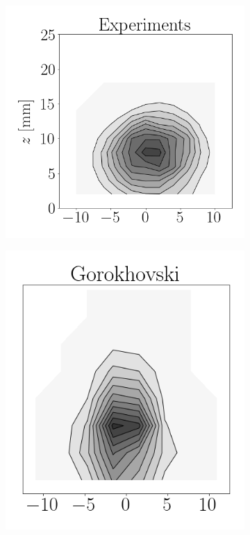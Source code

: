 \begin{figure}[t!]
\flushleft
\begin{subfigure}[b]{0.2\textwidth}
	\flushleft
   \includegraphics[scale=0.4]{./part2_developments/figures_ch6_lagrangian_JICF/params_breakup_model/maps/expe_flux}
\end{subfigure}
\hspace*{0.27in}
\begin{subfigure}[b]{0.2\textwidth}
	\flushleft
   \includegraphics[scale=0.4]{./part2_developments/figures_ch6_lagrangian_JICF/params_breakup_model/maps/goro_flux}

\end{subfigure}
\end{figure}
